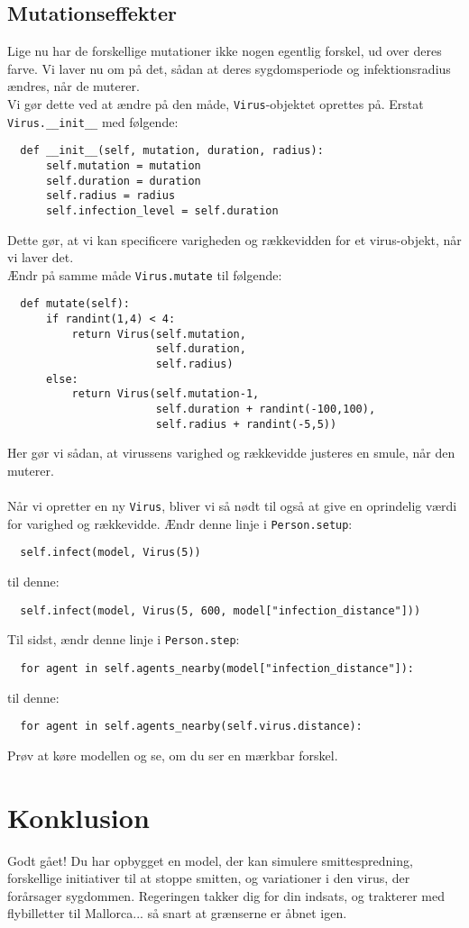 \documentclass{article}
\begin{document}
\subsection{Mutationseffekter}
Lige nu har de forskellige mutationer ikke nogen egentlig forskel, ud over deres farve. Vi laver nu om på det, sådan at deres sygdomsperiode og infektionsradius ændres, når de muterer.\\
Vi gør dette ved at ændre på den måde, \texttt{Virus}-objektet oprettes på. Erstat \texttt{Virus.\_\_init\_\_} med følgende:
\begin{lstlisting}
  def __init__(self, mutation, duration, radius):
      self.mutation = mutation
      self.duration = duration
      self.radius = radius
      self.infection_level = self.duration
\end{lstlisting}
Dette gør, at vi kan specificere varigheden og rækkevidden for et virus-objekt, når vi laver det.\\
Ændr på samme måde \texttt{Virus.mutate} til følgende:
\begin{lstlisting}
  def mutate(self):
      if randint(1,4) < 4:
          return Virus(self.mutation,
                       self.duration,
                       self.radius)
      else:
          return Virus(self.mutation-1,
                       self.duration + randint(-100,100),
                       self.radius + randint(-5,5))
\end{lstlisting}
Her gør vi sådan, at virussens varighed og rækkevidde justeres en smule, når den muterer.\\\\
Når vi opretter en ny \texttt{Virus}, bliver vi så nødt til også at give en oprindelig værdi for varighed og rækkevidde. Ændr denne linje i \texttt{Person.setup}:
\begin{lstlisting}
  self.infect(model, Virus(5))
\end{lstlisting}
til denne:
\begin{lstlisting}
  self.infect(model, Virus(5, 600, model["infection_distance"]))
\end{lstlisting}
Til sidst, ændr denne linje i \texttt{Person.step}:
\begin{lstlisting}
  for agent in self.agents_nearby(model["infection_distance"]):
\end{lstlisting}
til denne:
\begin{lstlisting}
  for agent in self.agents_nearby(self.virus.distance):
\end{lstlisting}
Prøv at køre modellen og se, om du ser en mærkbar forskel.

\section{Konklusion}
Godt gået! Du har opbygget en model, der kan simulere smittespredning, forskellige initiativer til at stoppe smitten, og variationer i den virus, der forårsager sygdommen. Regeringen takker dig for din indsats, og trakterer med flybilletter til Mallorca... så snart at grænserne er åbnet igen.
\end{document}
